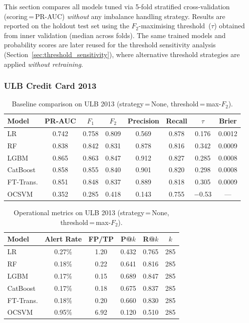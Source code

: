 This section compares all models tuned via 5-fold stratified cross-validation
(scoring\,=\,PR-AUC) \emph{without} any imbalance handling strategy.
Results are reported on the holdout test set using the
$F_2$-maximising threshold~($\tau$) obtained from inner validation
(median across folds).
The same trained models and probability scores are later reused for
the threshold sensitivity analysis (Section~\ref{sec:threshold_sensitivity}),
where alternative threshold strategies are applied \emph{without retraining}.


\subsubsection{ULB Credit Card 2013}

\begin{table}[ht]
\centering
\caption{Baseline comparison on ULB 2013 (strategy\,=\,None, threshold\,=\,max-$F_2$).}
\label{tab:baseline_ulb}
\begin{tabular}{l c c c c c c c}
\toprule
Model & PR-AUC & $F_1$ & $F_2$ & Precision & Recall & $\tau$ & Brier \\
\midrule
LR        & 0.742 & 0.758 & 0.809 & 0.569 & 0.878 & 0.176 & 0.0012 \\
RF        & 0.838 & 0.842 & 0.831 & 0.878 & 0.816 & 0.342 & 0.0009 \\
LGBM      & 0.865 & 0.863 & 0.847 & 0.912 & 0.827 & 0.285 & 0.0008 \\
CatBoost  & 0.858 & 0.855 & 0.840 & 0.901 & 0.820 & 0.298 & 0.0008 \\
FT-Trans. & 0.851 & 0.848 & 0.837 & 0.889 & 0.818 & 0.305 & 0.0009 \\
OCSVM     & 0.352 & 0.285 & 0.418 & 0.143 & 0.755 & $-$0.53 & --- \\
\bottomrule
\end{tabular}
\end{table}

\begin{table}[ht]
\centering
\caption{Operational metrics on ULB 2013 (strategy\,=\,None, threshold\,=\,max-$F_2$).}
\label{tab:baseline_ulb_ops}
\begin{tabular}{l c c c c c}
\toprule
Model & Alert Rate & FP/TP & P@$k$ & R@$k$ & $k$ \\
\midrule
LR        & 0.27\% & 1.20 & 0.432 & 0.765 & 285 \\
RF        & 0.18\% & 0.22 & 0.641 & 0.816 & 285 \\
LGBM      & 0.17\% & 0.15 & 0.689 & 0.847 & 285 \\
CatBoost  & 0.17\% & 0.18 & 0.675 & 0.837 & 285 \\
FT-Trans. & 0.18\% & 0.20 & 0.660 & 0.830 & 285 \\
OCSVM     & 0.95\% & 6.92 & 0.120 & 0.510 & 285 \\
\bottomrule
\end{tabular}
\end{table}

